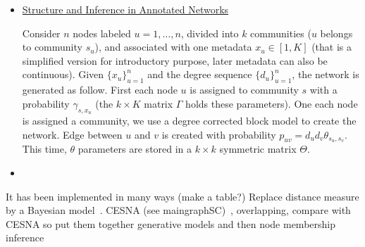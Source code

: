 \begin{itemize}[leftmargin=*]
\begin{quote}
{The $P ( c | X)$ simply takes a multi-logistic regression form, where we will
assume $\beta_K = 0$ for identifiability.}
\end{quote}

\item\href{https://arxiv.org/abs/1507.04001}{Structure and Inference in
  Annotated Networks}~\autocite{Newman2016}

Consider $n$ nodes labeled $u=1,\ldots,n$, divided into $k$ communities ($u$
belongs to community $s_u$), and associated with one metadata $x_u \in [1, K]$
(that is a simplified version for introductory purpose, later metadata can also
be continuous). Given $\{x_u\}_{u=1}^n$ and the degree sequence
$\{d_u\}_{u=1}^n$, the network is generated as follow. First each node $u$ is
assigned to community $s$ with a probability $\gamma_{s,x_u}$ (the $k\times K$
matrix $\Gamma$ holds these parameters). One each node is assigned a community,
we use a degree corrected block model to create the network.  Edge between $u$
and $v$ is created with probability $p_{uv} = d_ud_v\theta_{s_u,s_v}$. This
time, $\theta$ parameters are stored in a $k\times k$ symmetric matrix $\Theta$.

\item \href{http://doi.org/10.1103/PhysRevE.95.042317}{}
  \autocite{DeBacco2017}


\end{itemize}

It has been implemented in many ways (make a table?)
Replace distance measure by a Bayesian model~\autocites{Xu2012}{Xu2014}{Zhao2017}.
CESNA (see maingraphSC)~\autocite{Yang2013}, overlapping, compare with CESNA so put them together
\autocite{Chesnokov2017}
generative models and then node membership inference~\autocites{Kataoka2016}{Weng2016}{Newman2016}
\fi





%



